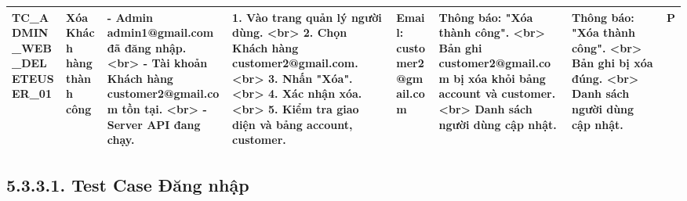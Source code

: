 \documentclass[a4paper,12pt]{article}
\begin{document}
\begin{longtable}{|p{2cm}|p{3cm}|p{3cm}|p{4cm}|p{3cm}|p{3cm}|p{3cm}|p{2cm}|}
    TC_ADMIN_WEB_DELETEUSER_01 & Xóa Khách hàng thành công & - Admin admin1@gmail.com đã đăng nhập. <br> - Tài khoản Khách hàng customer2@gmail.com tồn tại. <br> - Server API đang chạy. & 1. Vào trang quản lý người dùng. <br> 2. Chọn Khách hàng customer2@gmail.com. <br> 3. Nhấn "Xóa". <br> 4. Xác nhận xóa. <br> 5. Kiểm tra giao diện và bảng account, customer. & Email: customer2@gmail.com & Thông báo: "Xóa thành công". <br> Bản ghi customer2@gmail.com bị xóa khỏi bảng account và customer. <br> Danh sách người dùng cập nhật. & Thông báo: "Xóa thành công". <br> Bản ghi bị xóa đúng. <br> Danh sách người dùng cập nhật. & P \\ \hline
\end{longtable}

\subsection{5.3.3.1. Test Case Đăng nhập}
\end{document}
